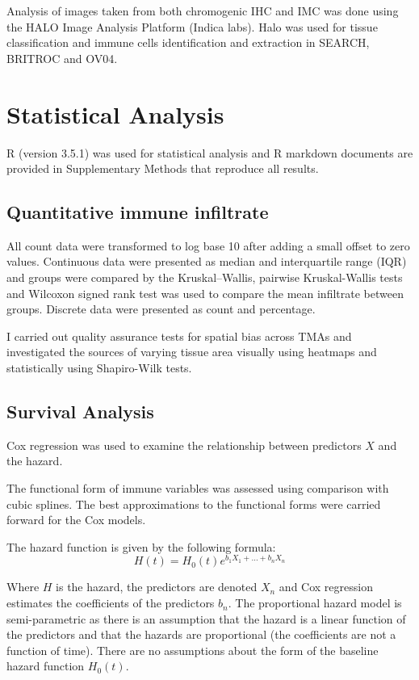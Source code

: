 Analysis of images taken from both chromogenic IHC and IMC was done using the HALO Image Analysis Platform (Indica labs). Halo was used for tissue classification and immune cells identification and extraction in SEARCH, BRITROC and OV04. 

\section{Statistical Analysis}  %
\label{section1.4}

R (version 3.5.1) was used for statistical analysis and R markdown documents are provided in Supplementary Methods that reproduce all results. 


\subsection{Quantitative immune infiltrate}
All count data were transformed to log base 10 after adding a small offset to zero values. Continuous data were presented as median and interquartile range (IQR) and groups were compared by the Kruskal–Wallis, pairwise Kruskal-Wallis tests and Wilcoxon signed rank test was used to compare the mean infiltrate between groups. Discrete data were presented as count and percentage.  

I carried out quality assurance tests for spatial bias across TMAs and investigated the sources of varying tissue area visually using heatmaps and statistically using Shapiro-Wilk tests.


\subsection{Survival Analysis}

Cox regression was used to examine the relationship between predictors $X$ and the hazard.

The functional form of immune variables was assessed using comparison with cubic splines. The best approximations to the functional forms were carried forward for the Cox models. 

The hazard function is given by the following formula:
\begin{equation}H(t) = H_0(t) e^ {b_1 X_1 + ... + b_n X_n} \end{equation} 

Where $H$ is the hazard, the predictors are denoted $X_n$ and Cox regression estimates the coefficients of the predictors $b_n$. The proportional hazard model is semi-parametric as there is an assumption that the hazard is a linear function of the predictors and that the hazards are proportional (the coefficients are not a function of time). There are no assumptions about the form of the baseline hazard function $H_0(t)$. 

